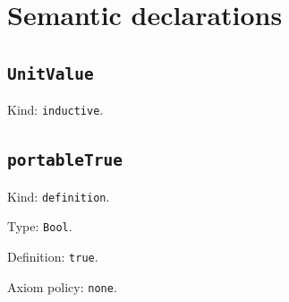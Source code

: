 \documentclass[11pt]{article}
\begin{document}
\section*{Semantic declarations}
\subsection*{\texttt{UnitValue}}
\noindent Kind: \texttt{inductive}.\par
\subsection*{\texttt{portableTrue}}
\noindent Kind: \texttt{definition}.\par
\noindent Type: \texttt{Bool}.\par
\noindent Definition: \texttt{true}.\par
\noindent Axiom policy: \texttt{none}.\par
\end{document}

